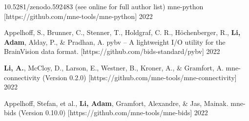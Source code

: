     
\begin{cventries}

    \cvpresentation
    {10.5281/zenodo.592483 (see online for full author list)} %
    {mne-python [https://github.com/mne-tools/mne-python]} %
    {2022} %
    {} %
    {\empty}
    {\empty}
    \vspace{-0.9cm}
    
    \cvpresentation
    {Appelhoff, S., Brunner, C., Stenner, T., Holdgraf, C. R., Höchenberger, R., \textbf{Li, Adam}, Alday, P., \& Pradhan, A.} %
    {pybv -- A lightweight I/O utility for the BrainVision data format. [https://github.com/bids-standard/pybv]} %
    {2022} %
    {} %
    {\empty}
    {\empty}
    \vspace{-0.9cm}
    
    \cvpresentation
    {\textbf{Li, A.}, McCloy, D., Larson, E., Westner, B., Kroner, A., \& Gramfort, A.} %
    {mne-connectivity (Version 0.2.0) [https://github.com/mne-tools/mne-connectivity]} %
    {2022} %
    {} %
    {\empty}
    {\empty}
    \vspace{-0.9cm}
    
    \cvpresentation
    {Appelhoff, Stefan, et al., \textbf{Li, Adam}, Gramfort, Alexandre, \& Jas, Mainak.} %
    {mne-bids (Version 0.10.0) [https://github.com/mne-tools/mne-bids]} %
    {2022} %
    {} %
    {\empty}
    {\empty}
    \vspace{-0.9cm}

\end{cventries}
